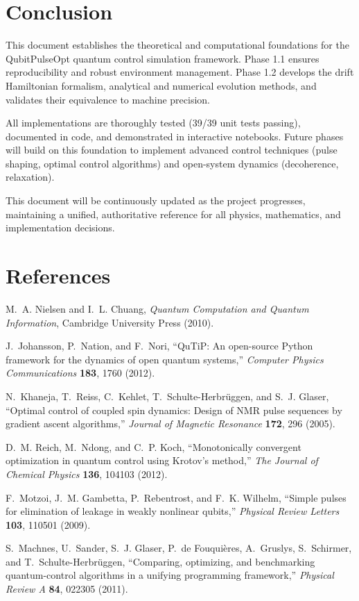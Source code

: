 \documentclass[11pt,a4paper]{article}
\theoremstyle{definition}
\theoremstyle{remark}
\begin{document}
\section{Conclusion}

This document establishes the theoretical and computational foundations for the QubitPulseOpt quantum control simulation framework. Phase 1.1 ensures reproducibility and robust environment management. Phase 1.2 develops the drift Hamiltonian formalism, analytical and numerical evolution methods, and validates their equivalence to machine precision.

All implementations are thoroughly tested (39/39 unit tests passing), documented in code, and demonstrated in interactive notebooks. Future phases will build on this foundation to implement advanced control techniques (pulse shaping, optimal control algorithms) and open-system dynamics (decoherence, relaxation).

This document will be continuously updated as the project progresses, maintaining a unified, authoritative reference for all physics, mathematics, and implementation decisions.

\section*{References}

\begin{enumerate}[label={[\arabic*]}]
    \item M.~A. Nielsen and I.~L. Chuang, \emph{Quantum Computation and Quantum Information}, Cambridge University Press (2010).
    \item J.~Johansson, P.~Nation, and F.~Nori, ``QuTiP: An open-source Python framework for the dynamics of open quantum systems,'' \emph{Computer Physics Communications} \textbf{183}, 1760 (2012).
    \item N.~Khaneja, T.~Reiss, C.~Kehlet, T.~Schulte-Herbr\"uggen, and S.~J. Glaser, ``Optimal control of coupled spin dynamics: Design of NMR pulse sequences by gradient ascent algorithms,'' \emph{Journal of Magnetic Resonance} \textbf{172}, 296 (2005).
    \item D.~M. Reich, M.~Ndong, and C.~P. Koch, ``Monotonically convergent optimization in quantum control using Krotov's method,'' \emph{The Journal of Chemical Physics} \textbf{136}, 104103 (2012).
    \item F.~Motzoi, J.~M. Gambetta, P.~Rebentrost, and F.~K. Wilhelm, ``Simple pulses for elimination of leakage in weakly nonlinear qubits,'' \emph{Physical Review Letters} \textbf{103}, 110501 (2009).
    \item S.~Machnes, U.~Sander, S.~J. Glaser, P.~de Fouquières, A.~Gruslys, S.~Schirmer, and T.~Schulte-Herbr\"uggen, ``Comparing, optimizing, and benchmarking quantum-control algorithms in a unifying programming framework,'' \emph{Physical Review A} \textbf{84}, 022305 (2011).
\end{enumerate}
\end{document}
